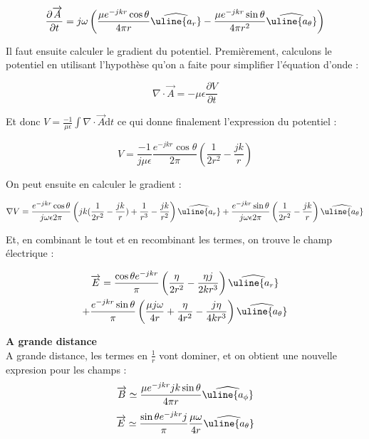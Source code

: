 \documentclass[10pt,a4paper]{article}
\newcommand{\PDeriv}[2]{\frac{\partial#1}{\partial#2}} %
\newcommand{\V}[1]{\overrightarrow{#1}}
\newcommand{\Base}[1]{\widehat{\uline{a_{#1}}}} %
\begin{document}
\begin{equation}
\PDeriv{\V{A}}{t} = j \omega \left( \frac{\mu e^{-jkr} \cos \theta}{4 \pi r} \Base{r} - \frac{\mu e^{-jkr} \sin \theta}{4 \pi r^2} \Base{\theta} \right)
\end{equation}

Il faut ensuite calculer le gradient du potentiel. Premièrement, calculons le potentiel en utilisant l'hypothèse qu'on a faite pour simplifier l'équation d'onde :

\begin{equation}
\nabla \cdot \V{A} = - \mu \epsilon \PDeriv{V}{t}
\end{equation}

Et donc $V = \frac{-1}{\mu \epsilon} \int \nabla \cdot \V{A} \mathrm{d}t$ ce qui donne finalement l'expression du potentiel :

\begin{equation}
V = \frac{-1}{j \mu \epsilon} \frac{e^{-jkr} \cos \theta}{2 \pi} \left( \frac{1}{2r^2} - \frac{jk}{r} \right)
\end{equation}

On peut ensuite en calculer le gradient :

\begin{equation}
\nabla V = \frac{e^{-jkr} \cos \theta}{j \omega \epsilon 2 \pi} \left( jk(\frac{1}{2r^2} - \frac{jk}{r}) + \frac{1}{r^3} - \frac{jk}{r^2} \right) \Base{r} + \frac{e^{-jkr} \sin \theta }{j \omega \epsilon 2 \pi} \left( \frac{1}{2r^2} - \frac{jk}{r} \right) \Base{\theta}
\end{equation}

Et, en combinant le tout et en recombinant les termes, on trouve le champ électrique :


\begin{multline}
\V{E} = \frac{\cos \theta e^{-jkr}}{\pi} \left( \frac{\eta}{2r^2}  - \frac{\eta j}{2kr^3}  \right) \Base{r} \\ 
+ \frac{e^{-jkr}\sin \theta}{\pi} \left( \frac{\mu j \omega}{4r} + \frac{\eta}{4 r^2} - \frac{j \eta }{4 k r^3} \right) \Base{\theta}
\end{multline}


\indent \textbf{A grande distance}\\
A grande distance, les termes en $\frac{1}{r}$ vont dominer, et on obtient une nouvelle expresion pour les champs :
\begin{equation}
\V{B} \simeq \frac{\mu e^{-jkr} jk \sin \theta}{4 \pi r} \Base{\phi}
\end{equation}
\begin{equation}
\V{E} \simeq \frac{\sin \theta e^{-jkr}j}{\pi}  \frac{\mu \omega}{4 r}  \Base{\theta}
\end{equation}
\end{document}
